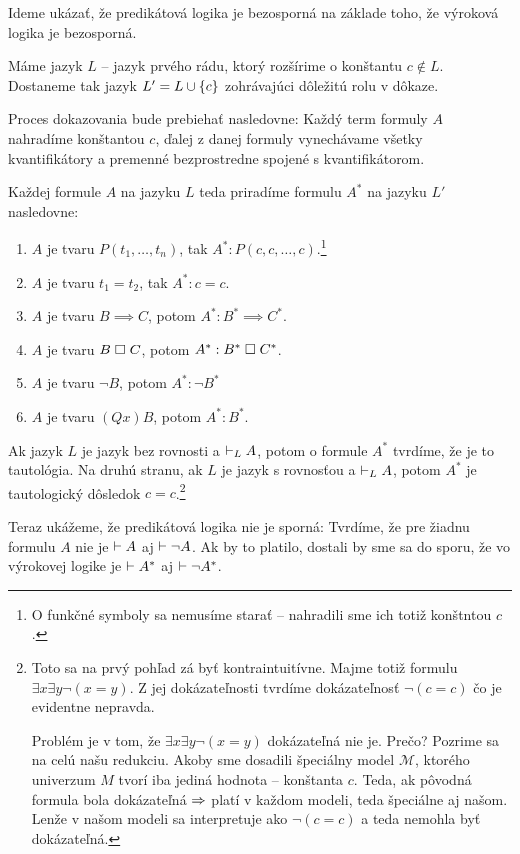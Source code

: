 \begin{priklad}
    Ideme ukázať, že predikátová logika je bezosporná na základe toho,
    že výroková logika je bezosporná.

    Máme jazyk $L$ -- jazyk prvého rádu,
    ktorý rozšírime o konštantu $c \notin L$.
    Dostaneme tak jazyk $L' = L \cup \{c\}$ zohrávajúci dôležitú
    rolu v dôkaze.

    Proces dokazovania bude prebiehať nasledovne:
    Každý term formuly $A$ nahradíme konštantou $c$,
    ďalej z danej formuly vynechávame všetky kvantifikátory a
    premenné bezprostredne spojené s kvantifikátorom.

    Každej formule $A$ na jazyku $L$ teda priradíme
    formulu $A^*$ na jazyku $L'$ nasledovne:
    \begin{enumerate}
        \item $A$ je tvaru $P(t_1, \dots ,t_n)$,
                tak $A^*: P(c, c, \dots,c)$.\footnote{
                O funkčné symboly sa nemusíme starať -- nahradili sme
                ich totiž konštntou $c$.
            }

        \item $A$ je tvaru $t_1=t_2$,
                tak $A^*: c=c$.

        \item $A$ je tvaru $B \implies C$,
                potom $A^*: B^* \implies C^*$.

        \item $A$ je tvaru $B \;\square\; C$,
                potom $A^*: B^* \;\square\; C^*$.

        \item $A$ je tvaru $\neg B$,
                potom $A^*: \neg B^*$

        \item $A$ je tvaru $(Qx) B$, potom $A^*: B^*$.
    \end{enumerate}

    Ak jazyk $L$ je jazyk bez rovnosti a $\vdash_L A$, potom
    o formule $A^*$ tvrdíme, že je to tautológia.
    Na druhú stranu, ak $L$ je jazyk s rovnosťou a $\vdash_L A$,
    potom $A^*$ je tautologický dôsledok $c=c$.\footnote{
        Toto sa na prvý pohľad zá byť kontraintuitívne. Majme totiž
        formulu $\exists x \exists y \neg (x=y)$. Z jej dokázateľnosti
        tvrdíme dokázateľnosť $\neg (c=c)$ čo je evidentne nepravda.

        Problém je v tom, že $\exists x \exists y \neg (x=y)$
        dokázateľná nie je. Prečo? Pozrime sa na celú našu redukciu.
        Akoby sme dosadili špeciálny model $\mathcal{M}$, ktorého
        univerzum $M$ tvorí iba jediná hodnota -- konštanta $c$.
        Teda, ak pôvodná formula bola dokázateľná $\Rightarrow$ platí v
        každom modeli, teda špeciálne aj našom. Lenže v našom modeli
        sa interpretuje ako $\neg (c=c)$ a teda nemohla byť
        dokázateľná.
    }

    Teraz ukážeme, že predikátová logika nie je sporná:
    Tvrdíme, že pre žiadnu formulu $A$ nie je $\vdash A$ aj 
    $\vdash \neg A$.
    Ak by to platilo, dostali by sme sa do sporu,
    že vo výrokovej logike je $\vdash A^*$ aj $\vdash \neg A^*$.
\end{priklad}

